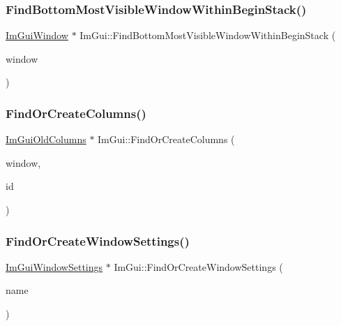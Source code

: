 \subsubsection{\texorpdfstring{Find\+Bottom\+Most\+Visible\+Window\+Within\+Begin\+Stack()}{FindBottomMostVisibleWindowWithinBeginStack()}}
{\footnotesize\ttfamily \hyperlink{structImGuiWindow}{Im\+Gui\+Window} $\ast$ Im\+Gui\+::\+Find\+Bottom\+Most\+Visible\+Window\+Within\+Begin\+Stack (\begin{DoxyParamCaption}\item[{\hyperlink{structImGuiWindow}{Im\+Gui\+Window} $\ast$}]{window }\end{DoxyParamCaption})}

\mbox{\label{namespaceImGui_af04eb535c152ed14c87940b5d0661c7b}} 
\subsubsection{\texorpdfstring{Find\+Or\+Create\+Columns()}{FindOrCreateColumns()}}
{\footnotesize\ttfamily \hyperlink{structImGuiOldColumns}{Im\+Gui\+Old\+Columns} $\ast$ Im\+Gui\+::\+Find\+Or\+Create\+Columns (\begin{DoxyParamCaption}\item[{\hyperlink{structImGuiWindow}{Im\+Gui\+Window} $\ast$}]{window,  }\item[{Im\+Gui\+ID}]{id }\end{DoxyParamCaption})}

\mbox{\label{namespaceImGui_ac2b283d79ae40a2ff00247898b8cc33b}} 
\subsubsection{\texorpdfstring{Find\+Or\+Create\+Window\+Settings()}{FindOrCreateWindowSettings()}}
{\footnotesize\ttfamily \hyperlink{structImGuiWindowSettings}{Im\+Gui\+Window\+Settings} $\ast$ Im\+Gui\+::\+Find\+Or\+Create\+Window\+Settings (\begin{DoxyParamCaption}\item[{const char $\ast$}]{name }\end{DoxyParamCaption})}

